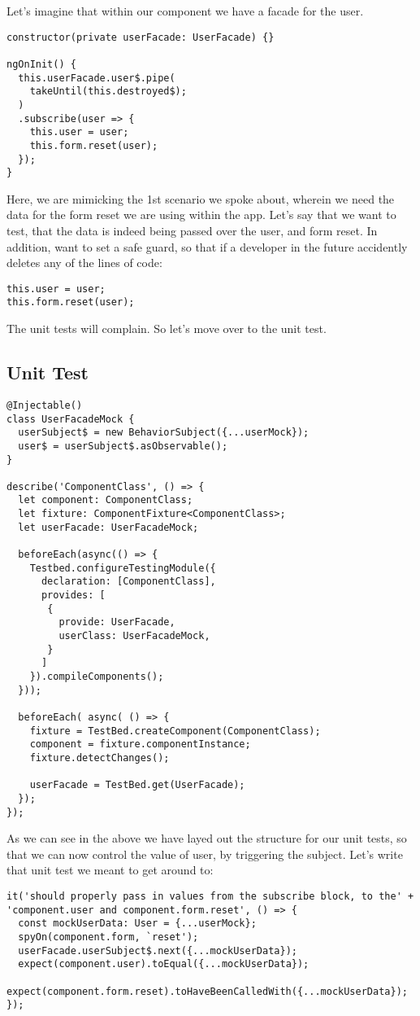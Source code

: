 Let's imagine that within our component we have a facade for the user.
\begin{lstlisting}
constructor(private userFacade: UserFacade) {}

ngOnInit() {
  this.userFacade.user$.pipe(
    takeUntil(this.destroyed$);
  )
  .subscribe(user => {
    this.user = user;
    this.form.reset(user);
  });
}
\end{lstlisting}

Here, we are mimicking the 1st scenario we spoke about, wherein we need the data
for the form reset we are using within the app. Let's say that we want to test,
that the data is indeed being passed over the user, and form reset. In addition,
want to set a safe guard, so that if a developer in the future accidently
deletes any of the lines of code:
\begin{verbatim}
this.user = user;
this.form.reset(user);
\end{verbatim}

The unit tests will complain. So let's move over to the unit test.

\subsection{ Unit Test }

\begin{lstlisting}
@Injectable()
class UserFacadeMock {
  userSubject$ = new BehaviorSubject({...userMock});
  user$ = userSubject$.asObservable();
}

describe('ComponentClass', () => {
  let component: ComponentClass;
  let fixture: ComponentFixture<ComponentClass>;
  let userFacade: UserFacadeMock;

  beforeEach(async(() => {
    Testbed.configureTestingModule({
      declaration: [ComponentClass],
      provides: [
       {
         provide: UserFacade,
         userClass: UserFacadeMock,
       }
      ]
    }).compileComponents();
  }));

  beforeEach( async( () => {
    fixture = TestBed.createComponent(ComponentClass);
    component = fixture.componentInstance;
    fixture.detectChanges();

    userFacade = TestBed.get(UserFacade);
  });
});
\end{lstlisting}

As we can see in the above we have layed out the structure for our unit tests,
so that we can now control the value of user, by triggering the subject. Let's
write that unit test we meant to get around to:
\begin{lstlisting}
it('should properly pass in values from the subscribe block, to the' +
'component.user and component.form.reset', () => {
  const mockUserData: User = {...userMock};
  spyOn(component.form, `reset');
  userFacade.userSubject$.next({...mockUserData});
  expect(component.user).toEqual({...mockUserData});
  expect(component.form.reset).toHaveBeenCalledWith({...mockUserData});
});
\end{lstlisting}
